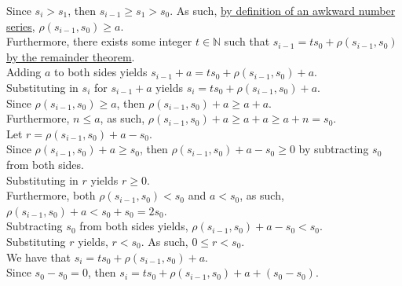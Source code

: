 \documentclass[a4paper,12pt]{article}
\begin{document}
\noindent Since $s_i > s_1$, then $s_{i - 1} \geq s_1 > s_0$. As such, \hyperlink{definition:awkward_number_series}{by definition of an awkward number series}, $\rho(s_{i - 1}, s_0) \geq a$.\\

\noindent Furthermore, there exists some integer $t \in \mathbb{N}$ such that $s_{i - 1} = ts_0 + \rho(s_{i - 1}, s_0)$ \hyperlink{theorem:remainder_theorem}{by the remainder theorem}.\\

\noindent Adding $a$ to both sides yields $s_{i - 1} + a = ts_0 + \rho(s_{i - 1}, s_0) + a$.\\

\noindent Substituting in $s_i$ for $s_{i - 1} + a$ yields $s_i = ts_0 + \rho(s_{i - 1}, s_0) + a$.\\

\noindent Since $\rho(s_{i - 1}, s_0) \geq a$, then $\rho(s_{i - 1}, s_0) + a \geq a + a$.\\

\noindent Furthermore, $n \leq a$, as such, $\rho(s_{i - 1}, s_0) + a \geq a + a \geq a + n = s_0$.\\

\noindent Let $r = \rho(s_{i - 1}, s_0) + a - s_0$.\\

\noindent Since $\rho(s_{i - 1}, s_0) + a \geq s_0$, then $\rho(s_{i - 1}, s_0) + a - s_0 \geq 0$ by subtracting $s_0$ from both sides.\\

\noindent Substituting in $r$ yields $r \geq 0$.\\

\noindent Furthermore, both $\rho(s_{i - 1}, s_0) < s_0$ and $a < s_0$, as such,\\ $\rho(s_{i - 1}, s_0) + a < s_0 + s_0 = 2s_0$.\\

\noindent Subtracting $s_0$ from both sides yields, $\rho(s_{i - 1}, s_0) + a - s_0 < s_0$.\\

\noindent Substituting $r$ yields, $r < s_0$. As such, $0 \leq r < s_0$.\\

\noindent We have that $s_i = ts_0 + \rho(s_{i - 1}, s_0) + a$.\\

\noindent Since $s_0 - s_0 = 0$, then $s_i = ts_0 + \rho(s_{i - 1}, s_0) + a + (s_0 - s_0)$.\\
\end{document}
